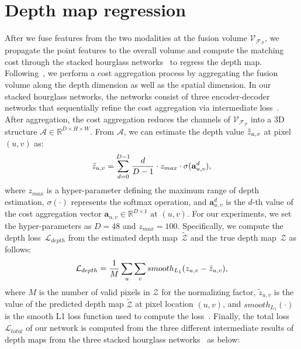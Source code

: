 \documentclass[letterpaper, 10 pt, conference]{ieeeconf}
\begin{document}
\section{Depth map regression}
\label{sec:Depth regression}

After we fuse features from the two modalities at the fusion volume $\mathcal{V}_{\mathcal{F}_{\mathcal{P}}}$, we propagate the point features to the overall volume and compute the matching cost through the stacked hourglass networks~\cite{hourglass,psmnet} to regress the depth map. Following~\cite{psmnet}, we perform a cost aggregation process by aggregating the fusion volume along the depth dimension as well as the spatial dimension. In our stacked hourglass networks, the networks consist of three encoder-decoder networks that sequentially refine the cost aggregation via intermediate loss~\cite{psmnet,hourglass,ganet}. After aggregation, the cost aggregation reduces the channels of $\mathcal{V}_{\mathcal{F}_{\mathcal{P}}}$ into a 3D structure $\mathcal{A} \in \mathbb{R}^{D \times H \times W}$. From $\mathcal{A}$, we can estimate the depth value $\Tilde{z}_{u, v}$ at pixel $(u, v)$ as: \vspace{-1mm}
\begin{equation}
    \Tilde{z}_{u, v} = \sum_{d=0}^{D-1} \frac{d}{D-1} \cdot z_{max} \cdot \sigma ({\mathbf{a}}_{u,v}^{d}),
\vspace{-1mm}
\end{equation}
where $z_{max}$ is a hyper-parameter defining the maximum range of depth estimation, $\sigma(\cdot)$ represents the softmax operation, and ${\mathbf{a}}_{u,v}^{d}$ is the $d$-th value of the cost aggregation vector ${\mathbf{a}}_{u,v} \in \mathbb{R}^{D\times 1} \text{ at } (u, v)$. For our experiments, we set the hyper-parameters as $D=48$ and $z_{max}=100$. Specifically, we compute the depth loss~$\mathcal{L}_{depth}$ from the estimated depth map~$\tilde{\mathcal{Z}}$ and the true depth map~$\mathcal{Z}$ as follows: \vspace{-1mm}
\begin{equation}
    \mathcal{L}_{depth} = \frac{1}{M}\sum_{u}\sum_{v} smooth_{L_{1}}({z}_{u,v} - \tilde{z}_{u,v}),
    \vspace{-1mm}
    \label{equation:disp-loss}
\end{equation}
where $M$ is the number of valid pixels in $\mathcal{Z}$ for the normalizing factor, $\tilde{z}_{u,v}$ is the value of the predicted depth map $\widetilde{\mathcal{Z}}$ at pixel location $(u, v)$, and $smooth_{L_{1}}(\cdot)$ is the smooth L1 loss function used to compute the loss~\cite{gcnet,psmnet}. Finally, the total loss $\mathcal{L}_{total}$ of our network is computed from the three different intermediate results of depth maps from the three stacked hourglass networks~\cite{psmnet,hourglass} as below:
\end{document}
